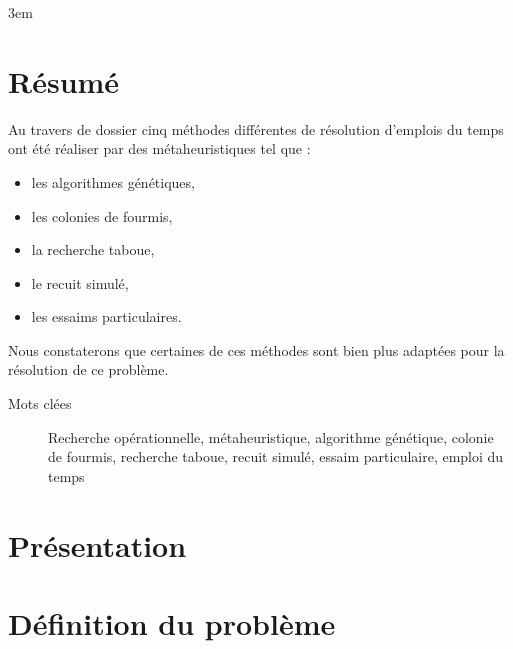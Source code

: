 \documentclass{librairies/lib}
\begin{document}
    \emergencystretch 3em

    


    \newpage
    \pagestyle{no_number}
    \section*{Résumé}


    Au travers de dossier cinq méthodes différentes de résolution d'emplois du temps ont été réaliser par des métaheuristiques tel que :
    \begin{itemize}
        \item les algorithmes génétiques,
        \item les colonies de fourmis,
        \item la recherche taboue,
        \item le recuit simulé,
        \item les essaims particulaires.
    \end{itemize}
    Nous constaterons que certaines de ces méthodes sont bien plus adaptées pour la résolution de ce problème.
    \begin{description}
        \item[Mots clées] Recherche opérationnelle, métaheuristique, algorithme génétique, colonie de fourmis, recherche taboue, recuit simulé, essaim particulaire, emploi du temps
    \end{description}

    \newpage



    \tableofcontents
    \newpage



    \pagestyle{number}


    \section{Présentation}\label{sec:presentation}

    


    \newpage


    \section{Définition du problème}\label{sec:definition-du-probleme}
\end{document}
